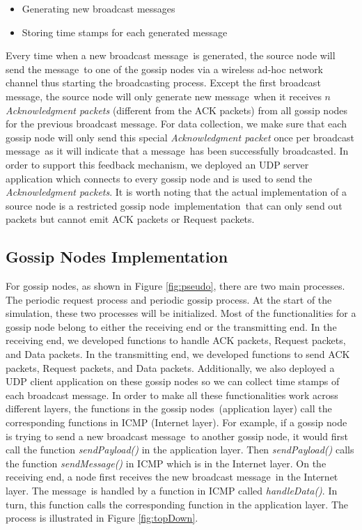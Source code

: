 \documentclass[onehalf,11pt]{beavtex}
\newcommand{\msgs}{messages}
\newcommand{\msg}{message}
\newcommand{\gn}{gossip node}
\newcommand{\gns}{gossip nodes}
\newcommand{\im}{implementation}
\begin{document}
\begin{itemize}
	\item Generating new broadcast \msgs
	\item Storing time stamps for each generated \msg
\end{itemize}

Every time when a new broadcast \msg ~is generated, the source node will send the \msg ~to one of the gossip nodes via a wireless ad-hoc network channel thus starting the broadcasting process. Except the first broadcast \msg, the source node will only generate new \msg ~when it receives $n$ \emph{Acknowledgment packets} (different from the ACK packets) from all gossip nodes for the previous broadcast \msg. For data collection, we make sure that each gossip node will only send this special \emph{Acknowledgment packet} once per broadcast \msg ~as it will indicate that a \msg ~has been successfully broadcasted. In order to support this feedback mechanism, we deployed an UDP server application which connects to every gossip node and is used to send the \emph{Acknowledgment packets}. It is worth noting that the actual implementation of a source node is a restricted  \gn ~\im ~that can only send out packets but cannot emit ACK packets or Request packets. 

\subsection{Gossip Nodes Implementation}
For gossip nodes, as shown in Figure \ref{fig:pseudo}, there are two main processes. The periodic request process and periodic gossip process. At the start of the simulation, these two processes will be initialized. Most of the functionalities for a gossip node belong to either the receiving end or the transmitting end. In the receiving end, we developed functions to handle ACK packets, Request packets, and Data packets. In the transmitting end, we developed functions to send ACK packets, Request packets, and Data packets. Additionally, we also deployed a UDP client application on these gossip nodes so we can collect time stamps of each broadcast \msg. In order to make all these functionalities work across different layers, the functions in the \gns ~(application layer) call the corresponding functions in ICMP (Internet layer). For example, if a gossip node is trying to send a new broadcast \msg ~to another gossip node, it would first call the function \emph{sendPayload()} in the application layer. Then \emph{sendPayload()} calls the function \emph{sendMessage()} in ICMP which is in the Internet layer. On the receiving end, a node first receives the new broadcast \msg ~in the Internet layer. The \msg ~is handled by a function in ICMP called \emph{handleData()}. In turn, this function calls the corresponding function in the application layer. The process is illustrated in Figure \ref{fig:topDown}.
\end{document}
